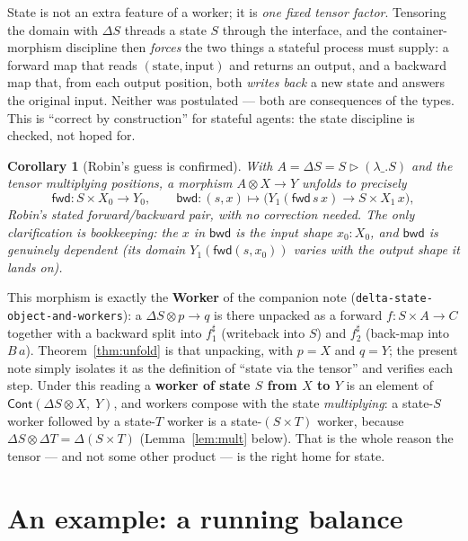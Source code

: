 \documentclass[11pt]{article}
\newcommand{\ctr}{\mathbin{\triangleright}}      %
\newcommand{\Cont}{\mathsf{Cont}}
\newcommand{\fwd}{\mathsf{fwd}}
\newcommand{\bwd}{\mathsf{bwd}}
\newcommand{\bk}[1]{{#1}^{\sharp}}                %
\theoremstyle{plain}
\newtheorem{corollary}{Corollary}
\theoremstyle{definition}
\begin{document}
\begin{deepbox}
State is not an extra feature of a worker; it is \emph{one fixed tensor factor}. Tensoring the
domain with $\Delta S$ threads a state $S$ through the interface, and the container-morphism
discipline then \emph{forces} the two things a stateful process must supply: a forward map that
reads $(\text{state},\text{input})$ and returns an output, and a backward map that, from each output
position, both \emph{writes back} a new state and answers the original input. Neither was postulated
--- both are consequences of the types. This is ``correct by construction'' for stateful agents:
the state discipline is checked, not hoped for.
\end{deepbox}

\begin{corollary}[Robin's guess is confirmed]\label{cor:confirm}
With $A=\Delta S = S\ctr(\lambda\_.S)$ and the tensor multiplying positions, a morphism
$A\otimes X\to Y$ unfolds to precisely
\[
  \fwd : S\times X_0 \to Y_0,
  \qquad
  \bwd : (s,x)\mapsto \big(Y_1(\fwd\,s\,x)\to S\times X_1\,x\big),
\]
Robin's stated forward/backward pair, with no correction needed. The only clarification is
bookkeeping: the $x$ in $\bwd$ is the input \emph{shape} $x_0:X_0$, and $\bwd$ is genuinely
dependent (its domain $Y_1(\fwd(s,x_0))$ varies with the output shape it lands on).
\end{corollary}

\noindent This morphism is exactly the \textbf{Worker} of the companion note
(\texttt{delta-state-object-and-workers}): a $\Delta S\otimes p\to q$ is there unpacked as a forward
$f:S\times A\to C$ together with a backward split into $\bk f_1$ (writeback into $S$) and $\bk f_2$
(back-map into $B\,a$). Theorem~\ref{thm:unfold} is that unpacking, with $p=X$ and $q=Y$; the
present note simply isolates it as the definition of ``state via the tensor'' and verifies each
step. Under this reading a \textbf{worker of state $S$ from $X$ to $Y$} is an element of
$\Cont(\Delta S\otimes X,\; Y)$, and workers compose with the state \emph{multiplying}: a state-$S$
worker followed by a state-$T$ worker is a state-$(S\times T)$ worker, because
$\Delta S\otimes\Delta T = \Delta(S\times T)$ (Lemma~\ref{lem:mult} below). That is the whole reason
the tensor --- and not some other product --- is the right home for state.

\section{An example: a running balance}\label{sec:example}
\end{document}
